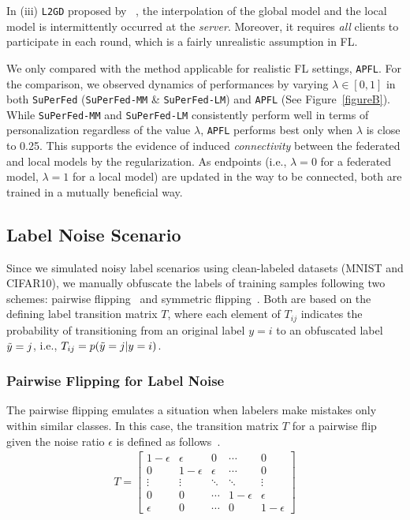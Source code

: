 \documentclass[sigconf]{acmart}
\begin{document}
In (iii) \texttt{L2GD} proposed by ~\cite{l2sgd}, the interpolation of the global model and the local model is intermittently occurred at the \textit{server}. Moreover, it requires \textit{all} clients to participate in each round, which is a fairly unrealistic assumption in FL.

We only compared with the method applicable for realistic FL settings, \texttt{APFL}. For the comparison, we observed dynamics of performances by varying $\lambda\in[0,1]$ in both \texttt{SuPerFed} (\texttt{SuPerFed-MM} \& \texttt{SuPerFed-LM}) and \texttt{APFL} (See Figure~\ref{figureB}). While \texttt{SuPerFed-MM} and \texttt{SuPerFed-LM} consistently perform well in terms of personalization regardless of the value $\lambda$, \texttt{APFL} performs best only when $\lambda$ is close to 0.25. This supports the evidence of induced \textit{connectivity} between the federated and local models by the regularization. As endpoints (i.e., $\lambda=0$ for a federated model, $\lambda=1$ for a local model) are updated in the way to be connected, both are trained in a mutually beneficial way.

\subsection{Label Noise Scenario}
Since we simulated noisy label scenarios using clean-labeled datasets (MNIST and CIFAR10), we manually obfuscate the labels of training samples following two schemes: pairwise flipping~\cite{pair} and symmetric flipping~\cite{symm}. Both are based on the defining label transition matrix $T$, where each element of $T_{ij}$ indicates the probability of transitioning from an original label $y=i$ to an obfuscated label $\Tilde{y}=j$, i.e., $T_{ij}=p(\Tilde{y}=j|y=i)$. 

\subsubsection{Pairwise Flipping for Label Noise}
The pairwise flipping emulates a situation when labelers make mistakes only within similar classes. In this case, the transition matrix $T$ for a pairwise flip given the noise ratio $\epsilon$ is defined as follows~\cite{pair}.
\begin{align*}
T=\left[\begin{array}{ccccc}
1-\epsilon & \epsilon & 0 & \cdots & 0 \\
0 & 1-\epsilon & \epsilon & \cdots & 0 \\
\vdots & \vdots & \ddots & \ddots & \vdots \\
0 & 0 & \cdots & 1-\epsilon & \epsilon \\
\epsilon & 0 & \cdots & 0 & 1-\epsilon
\end{array}\right]
\end{align*}
\end{document}
